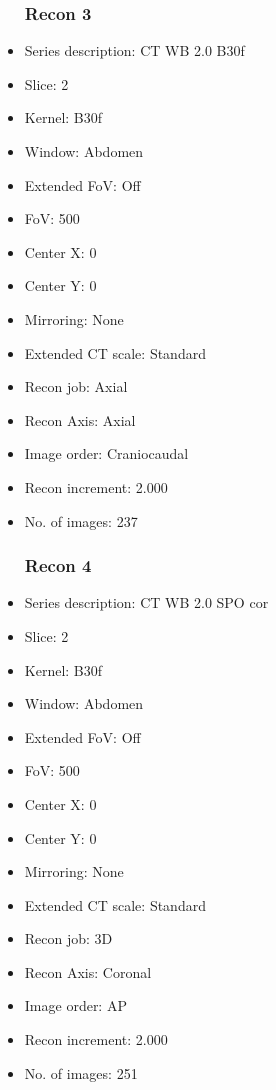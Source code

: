 \documentclass[12pt]{article}
\begin{document}
\begin{itemize}
\subsubsection{Recon 3}
\item Series description: CT WB 2.0 B30f
\item Slice: 2
\item Kernel: B30f
\item Window: Abdomen
\item Extended FoV: Off
\item FoV: 500
\item Center X: 0
\item Center Y: 0
\item Mirroring: None
\item Extended CT scale: Standard
\item Recon job: Axial
\item Recon Axis: Axial
\item Image order: Craniocaudal
\item Recon increment: 2.000
\item No. of images: 237
\subsubsection{Recon 4}
\item Series description: CT WB 2.0 SPO cor
\item Slice: 2
\item Kernel: B30f
\item Window: Abdomen
\item Extended FoV: Off
\item FoV: 500
\item Center X: 0
\item Center Y: 0
\item Mirroring: None
\item Extended CT scale: Standard
\item Recon job: 3D
\item Recon Axis: Coronal
\item Image order: AP
\item Recon increment: 2.000
\item No. of images: 251

\end{itemize}
\end{document}

